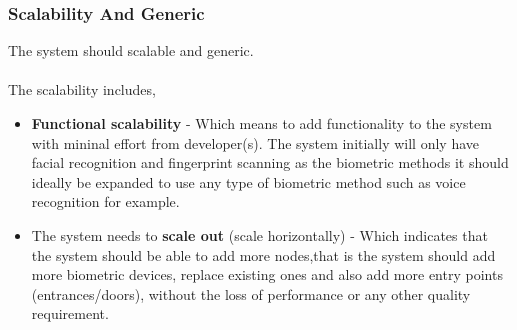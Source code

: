 \subsubsection{Scalability And Generic}
The system should scalable and generic.\\
\\The scalability includes,
\begin{itemize}
	\item  \textbf{Functional scalability} - Which means to add functionality to the system with mininal effort from developer(s).
		The system initially will only have facial recognition and fingerprint scanning as the biometric methods it should ideally be expanded to use any type of biometric method such as voice recognition for example.
	\item  The system needs to \textbf{scale out} (scale horizontally) - Which indicates that the system should be able to add more nodes,that 		is the system should add more biometric devices, replace existing ones and also add more entry points (entrances/doors), 			without the loss of performance or any other quality requirement.
\end{itemize}





